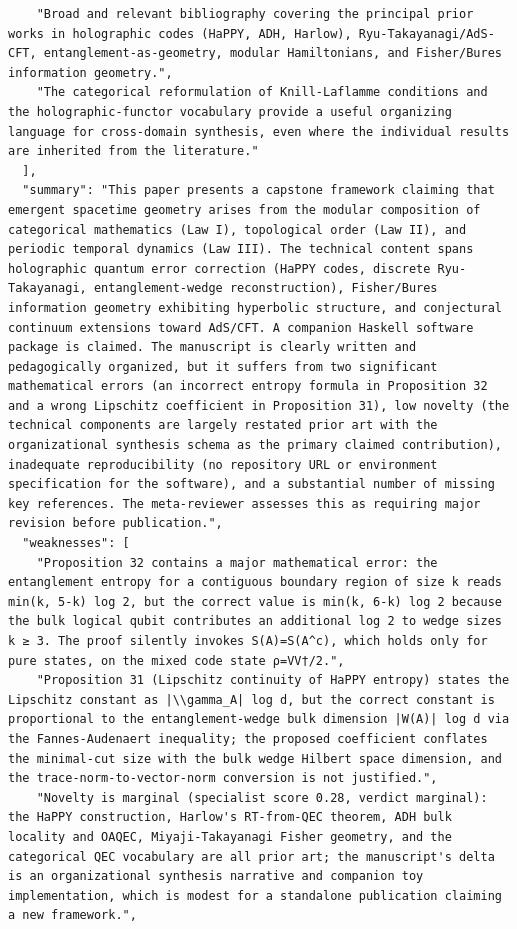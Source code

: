 \documentclass[11pt]{article}
\begin{document}
\begin{verbatim}
    "Broad and relevant bibliography covering the principal prior works in holographic codes (HaPPY, ADH, Harlow), Ryu-Takayanagi/AdS-CFT, entanglement-as-geometry, modular Hamiltonians, and Fisher/Bures information geometry.",
    "The categorical reformulation of Knill-Laflamme conditions and the holographic-functor vocabulary provide a useful organizing language for cross-domain synthesis, even where the individual results are inherited from the literature."
  ],
  "summary": "This paper presents a capstone framework claiming that emergent spacetime geometry arises from the modular composition of categorical mathematics (Law I), topological order (Law II), and periodic temporal dynamics (Law III). The technical content spans holographic quantum error correction (HaPPY codes, discrete Ryu-Takayanagi, entanglement-wedge reconstruction), Fisher/Bures information geometry exhibiting hyperbolic structure, and conjectural continuum extensions toward AdS/CFT. A companion Haskell software package is claimed. The manuscript is clearly written and pedagogically organized, but it suffers from two significant mathematical errors (an incorrect entropy formula in Proposition 32 and a wrong Lipschitz coefficient in Proposition 31), low novelty (the technical components are largely restated prior art with the organizational synthesis schema as the primary claimed contribution), inadequate reproducibility (no repository URL or environment specification for the software), and a substantial number of missing key references. The meta-reviewer assesses this as requiring major revision before publication.",
  "weaknesses": [
    "Proposition 32 contains a major mathematical error: the entanglement entropy for a contiguous boundary region of size k reads min(k, 5-k) log 2, but the correct value is min(k, 6-k) log 2 because the bulk logical qubit contributes an additional log 2 to wedge sizes k ≥ 3. The proof silently invokes S(A)=S(A^c), which holds only for pure states, on the mixed code state ρ=VV†/2.",
    "Proposition 31 (Lipschitz continuity of HaPPY entropy) states the Lipschitz constant as |\\gamma_A| log d, but the correct constant is proportional to the entanglement-wedge bulk dimension |W(A)| log d via the Fannes-Audenaert inequality; the proposed coefficient conflates the minimal-cut size with the bulk wedge Hilbert space dimension, and the trace-norm-to-vector-norm conversion is not justified.",
    "Novelty is marginal (specialist score 0.28, verdict marginal): the HaPPY construction, Harlow's RT-from-QEC theorem, ADH bulk locality and OAQEC, Miyaji-Takayanagi Fisher geometry, and the categorical QEC vocabulary are all prior art; the manuscript's delta is an organizational synthesis narrative and companion toy implementation, which is modest for a standalone publication claiming a new framework.",

\end{verbatim}
\end{document}
